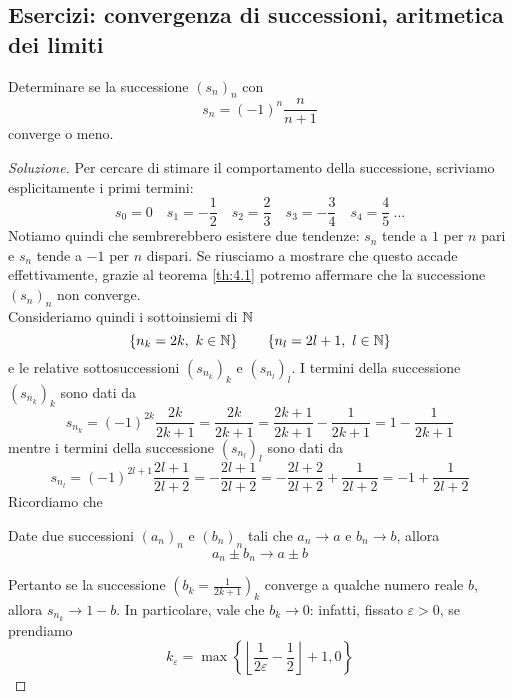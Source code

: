 \subsection{Esercizi: convergenza di successioni, aritmetica dei limiti}
\begin{exercise}
    \label{ex:4.1}
    Determinare se la successione $(s_n)_n$ con
    \[
    s_n = (-1)^n \frac{n}{n+1}
    \]
    converge o meno.
\end{exercise}
\begin{proof}[Soluzione]
    Per cercare di stimare il comportamento della successione, scriviamo esplicitamente i primi termini:
    \[
    s_0 = 0 \quad s_1 = -\frac{1}{2} \quad s_2 = \frac{2}{3} \quad s_3 = -\frac{3}{4} \quad s_4 = \frac{4}{5} \ \dots
    \]
    Notiamo quindi che sembrerebbero esistere due tendenze: $s_n$ tende a $1$ per $n$ pari e $s_n$ tende a $-1$ per $n$ dispari. Se riusciamo a mostrare che questo accade effettivamente, grazie al teorema \ref{th:4.1} potremo affermare che la successione $(s_n)_n$ non converge.\\
    Consideriamo quindi i sottoinsiemi di $\amsbb{N}$
    \[
    \left\{n_k = 2k, \ k\in\amsbb{N}\right\} \qquad \left\{n_l = 2l+1, \ l\in\amsbb{N}\right\}
    \]
    e le relative sottosuccessioni $(s_{n_k})_k$ e $(s_{n_l})_l$. I termini della successione $(s_{n_k})_k$ sono dati da
        \[
        s_{n_k} = (-1)^{2k} \frac{2k}{2k+1} = \frac{2k}{2k+1} = \frac{2k+1}{2k+1}-\frac{1}{2k+1} = 1-\frac{1}{2k+1}
        \]
    mentre i termini della successione $(s_{n_l})_l$ sono dati da
    \[
    s_{n_l} = (-1)^{2l+1}\frac{2l+1}{2l+2} = -\frac{2l+1}{2l+2} = -\frac{2l+2}{2l+2} + \frac{1}{2l+2} = -1 + \frac{1}{2l+2}
    \]
    Ricordiamo che
    \begin{tcolorbox}
        \begin{theorem}
            \label{th:4.2}
            Date due successioni $(a_n)_n$ e $(b_n)_n$ tali che $a_n \to a$ e $b_n \to b$, allora
            \[
            a_n \pm b_n \to a \pm b
            \]
        \end{theorem}
    \end{tcolorbox}
    Pertanto se la successione $\left(b_k = \frac{1}{2k+1}\right)_k$ converge a qualche numero reale $b$, allora $s_{n_k} \to 1-b$. In particolare, vale che $b_k \to 0$: infatti, fissato $\varepsilon>0$, se prendiamo
    \begin{equation}
        \label{eq:4.3}
        k_\varepsilon = \max\left\{ \left\lfloor\frac{1}{2\varepsilon}-\frac{1}{2} \right\rfloor+1, 0\right\}
    \end{equation}

\end{proof}
